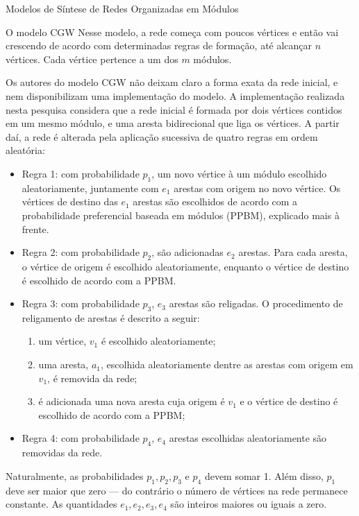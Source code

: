 \begin{section}{Modelos de Síntese de Redes Organizadas em Módulos}
\begin{subsection}{O modelo CGW}
Nesse modelo, a rede começa com poucos vértices e então vai crescendo de acordo com determinadas regras de formação, até alcançar $n$ vértices. Cada vértice pertence a um dos $m$ módulos.

Os autores do modelo CGW não deixam claro a forma exata da rede inicial, e nem disponibilizam uma implementação do modelo. A implementação realizada nesta pesquisa considera que a rede inicial é formada por dois vértices contidos em um mesmo módulo, e uma aresta bidirecional que liga os vértices. A partir daí, a rede é alterada pela aplicação sucessiva de quatro regras em ordem aleatória:

\begin{itemize}
	
	\item Regra 1: com probabilidade $p_1$, um novo vértice à um módulo escolhido aleatoriamente, juntamente com $e_1$ arestas com origem no novo vértice. Os vértices de destino das $e_1$ arestas são escolhidos de acordo com a probabilidade preferencial baseada em módulos (PPBM), explicado mais à frente.
	
	\item Regra 2: com probabilidade $p_2$, são adicionadas $e_2$ arestas. Para cada aresta, o vértice de origem é escolhido aleatoriamente, enquanto o vértice de destino é escolhido de acordo com a PPBM.
	
	\item Regra 3: com probabilidade $p_3$, $e_3$ arestas são religadas. O procedimento de religamento de arestas é descrito a seguir:
	
	\begin{enumerate}
		\item um vértice, $v_1$ é escolhido aleatoriamente;
		\item uma aresta, $a_1$, escolhida aleatoriamente dentre as arestas com origem em $v_1$, é removida da rede;
		\item é adicionada uma nova aresta cuja origem é $v_1$ e o vértice de destino é escolhido de acordo com a PPBM;
	\end{enumerate}
	
	\item Regra 4: com probabilidade $p_4$, $e_4$ arestas escolhidas aleatoriamente são removidas da rede.
	
\end{itemize}

Naturalmente, as probabilidades $p_1, p_2, p_3$ e $p_4$ devem somar 1. Além disso, $p_1$ deve ser maior que zero --- do contrário o número de vértices na rede permanece constante. As quantidades $e_1, e_2, e_3, e_4$ são inteiros maiores ou iguais a zero.


\end{subsection}
\end{section}
